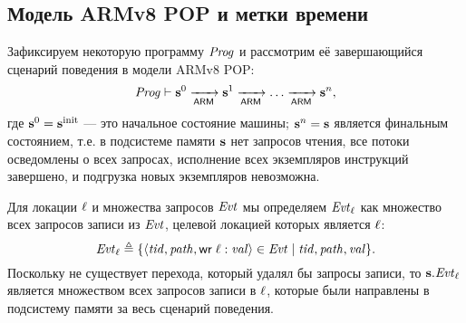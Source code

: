 \subsection{Модель ARMv8 POP и метки времени}
\label{sec:arm-timestamps}
Зафиксируем некоторую программу $\mathit{Prog}$ и рассмотрим её завершающийся сценарий
поведения в модели ARMv8 POP:
$$
\mathit{Prog} \vdash \mathbf{s}^0 \xrightarrow[\mathsf{ARM}]{} \mathbf{s}^1 \xrightarrow[\mathsf{ARM}]{} \dots \xrightarrow[\mathsf{ARM}]{} \mathbf{s}^n,
$$
где $\mathbf{s}^0 = \mathbf{s}^{\rm init}$ --- это начальное состояние машины; $\mathbf{s}^n = \mathbf{s}$ является финальным состоянием,
т.е. в подсистеме памяти $\mathbf{s}$ нет запросов чтения, все потоки осведомлены о всех
запросах, исполнение всех экземпляров инструкций завершено, и подгрузка новых
экземпляров невозможна.

Для локации $\ell$ и множества запросов $\mathit{Evt}$
мы определяем $\mathit{Evt}_{\ell}$ как множество всех запросов записи из $\mathit{Evt}$, целевой локацией
которых является $\ell$:
$$
\mathit{Evt}_{\ell} \triangleq \{ \langle \mathit{tid}, \mathit{path}, {\sf wr} \; \ell:\mathit{val} \rangle \in \mathit{Evt} \mid \mathit{tid}, \mathit{path}, \mathit{val} \}.
$$
Поскольку не существует перехода, который удалял бы запросы записи,
то $\mathbf{s}.\mathit{Evt}_{\ell}$ является множеством всех запросов записи в $\ell$,
которые были направлены в подсистему памяти за весь сценарий поведения.

